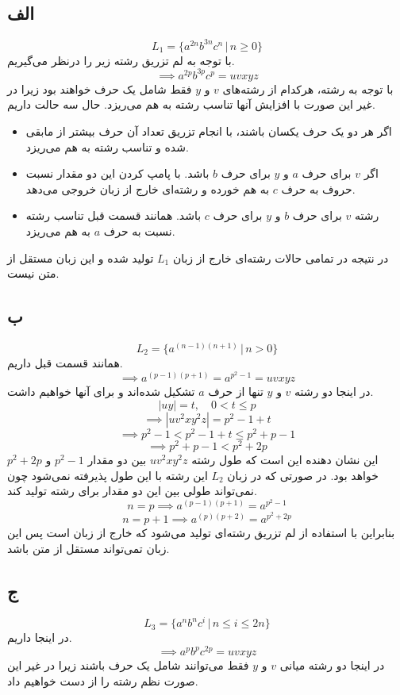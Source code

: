 \subsection*{الف}
\[
L_1 = \{a^{2n} b^{3n} c^n \,|\, n \geq 0\}    
\]
با توجه به لم تزریق رشته زیر را درنظر می‌گیریم.
\[
\implies a^{2p} b^{3p} c^p = uvxyz    
\]
با توجه به رشته، هرکدام از رشته‌های
$v$
و
$y$
فقط شامل یک حرف خواهند بود زیرا در غیر این صورت با افزایش آنها تناسب رشته به هم می‌ریزد. حال سه حالت داریم.
\begin{itemize}
	\item
	اگر هر دو یک حرف یکسان باشند، با انجام تزریق تعداد آن حرف بیشتر از مابقی شده و تناسب رشته به هم می‌ریزد.
	
	\item
	اگر
	$v$
	برای حرف
	$a$
	و
	$y$
	برای حرف
	$b$
	باشد. با پامپ کردن این دو مقدار نسبت حروف به حرف
	$c$
	به هم خورده و رشته‌ای خارج از زبان خروجی می‌دهد.
	
	\item
	رشته
	$v$
	برای حرف
	$b$
	و
	$y$
	برای حرف
	$c$
	باشد. همانند قسمت قبل تناسب رشته نسبت به حرف
	$a$
	به هم می‌ریزد.
\end{itemize}
در نتیجه در تمامی حالات رشته‌ای خارج از زبان
$L_1$
تولید شده و این زبان مستقل از متن نیست.

\subsection*{ب}
\[
L_2 = \{a^{(n - 1)(n + 1)} \,|\, n > 0\}    
\]
همانند قسمت قبل داریم.
\[
\implies a^{(p - 1)(p + 1)} = a^{p^2 - 1} = u v x y z    
\]
در اینجا دو رشته
$v$
و
$y$
تنها از حرف
$a$
تشکیل شده‌اند و برای آنها خواهیم داشت.
\[
|u y| = t, \quad 0 < t \leq p    
\]
\[
\implies |u v^2 x y^2 z| = p^2 - 1 + t    
\]
\[
\implies p^2 - 1 < p^2 - 1 + t  \leq p^2 + p - 1   
\]
\[
\implies p^2 + p - 1 < p^2 + 2p
\]
این نشان دهنده این است که طول رشته
$u v^2 x y^2 z$
بین دو مقدار
$p^2 - 1$
و
$p^2 + 2p$
خواهد بود. در صورتی که در زبان
$L_2$
این رشته با این طول پذیرفته نمی‌شود چون نمی‌تواند طولی بین این دو مقدار برای رشته تولید کند.
\[
n = p \implies a^{(p - 1)(p + 1)} = a^{p^2 - 1}
\]
\[
n = p + 1 \implies a^{(p)(p + 2)} = a^{p^2 + 2p}
\]
بنابراین با استفاده از لم تزریق رشته‌ای تولید می‌شود که خارج از زبان است پس این زبان تمی‌تواند مستقل از متن باشد.

\subsection*{ج}
\[
L_3 = \{a^n b^n c^i \,|\, n \leq i \leq 2n\}    
\]
در اینجا داریم.
\[
\implies a^p b^p c^{2p} = u v x y z    
\]
در اینجا دو رشته میانی
$v$
و
$y$
فقط می‌توانند شامل یک حرف باشند زیرا در غیر این صورت نظم رشته را از دست خواهیم داد.

